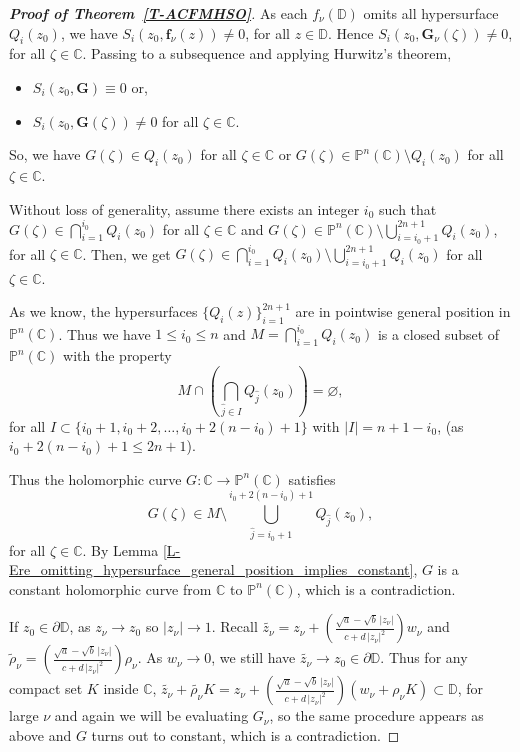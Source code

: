 \documentclass[11pt, reqno]{amsart}
\theoremstyle{definition}
\theoremstyle{remark}
\numberwithin{equation}{section}
\begin{document}
\begin{proof}[{\bf Proof of Theorem~\ref{T-ACFMHSO}}]
As each $f_{\nu}(\mathbb D)$ omits all hypersurface $Q_i(z_0)$, we have $S_i(z_0,\mathbf{f}_{\nu}(z))\neq 0$, for all 
$z\in\mathbb D$. Hence $S_i(z_0,\mathbf{G}_{\nu}(\zeta))\neq 0$, for all $\zeta\in\mathbb C$. Passing to a subsequence and applying Hurwitz's theorem,
\begin{itemize}
    \item $S_i(z_0,\mathbf{G})\equiv 0$ or,
    \item $S_i(z_0,\mathbf{G}(\zeta))\neq 0$ for all $\zeta\in\mathbb C$.
\end{itemize}
So, we have $G(\zeta)\in Q_i(z_0)$ for all $\zeta\in\mathbb C$ or $G(\zeta)\in\mathbb P^n(\mathbb C)\setminus Q_i(z_0)$
for all $\zeta\in\mathbb C$. %
\smallskip

Without loss of generality, assume there exists an integer $i_0$ such that $G(\zeta)\in\bigcap_{i=1}^{i_0} Q_i(z_0)$ for all 
$\zeta\in\mathbb C$ and $G(\zeta)\in\mathbb P^n(\mathbb C)\setminus \bigcup_{i=i_0+1}^{2n+1} Q_i(z_0)$, for all 
$\zeta\in\mathbb C$. Then, we get $G(\zeta)\in \bigcap_{i=1}^{i_0} Q_i(z_0)\setminus \bigcup_{i=i_0+1}^{2n+1} Q_i(z_0)$ 
for all $\zeta\in\mathbb C$. \smallskip

As we know, the hypersurfaces $\{Q_i(z)\}_{i=1}^{2n+1}$ are in pointwise general position in $\mathbb P^n(\mathbb C)$. Thus we
have $1\leq i_0\leq n$ and $M=\bigcap_{i=1}^{i_0} Q_i(z_0)$ is a closed subset of $\mathbb P^n(\mathbb C)$ with the property 
$$M\cap\left(\bigcap_{\hat{j}\in I} Q_{\hat{j}}(z_0)\right)=\varnothing,$$ for all $I\subset \{i_0+1,i_0+2,\dots, i_0+2(n-i_0)+1\}$ 
with $|I|=n+1-i_0$, (as $i_0+2(n-i_0)+1\leq 2n+1$).\smallskip

Thus the holomorphic curve $G:\mathbb C\to \mathbb P^n(\mathbb C)$ satisfies 
\begin{equation*}G(\zeta)\in M\setminus \bigcup_{\hat{j}=i_0+1}^{i_0+2(n-i_0)+1}Q_{\hat{j}}(z_0),\end{equation*}
for all $\zeta\in\mathbb C$. By Lemma \ref{L-Ere_omitting_hypersurface_general_position_implies_constant}, 
$G$ is a constant holomorphic curve from $\mathbb C$ to $\mathbb P^n(\mathbb C)$, which is a contradiction. \smallskip

If $z_0\in\partial\mathbb D$, as $z_{\nu}\to z_0$ so $|z_{\nu}|\to 1$. Recall 
$\widetilde{z_{\nu}}=z_{\nu}+\left(\frac{\sqrt{a}-\sqrt{b}\,|z_{\nu}|}{c+d\,|z_{\nu}|^2}\right)w_{\nu}$ and 
$\widetilde \rho_{\nu}=\left(\frac{\sqrt{a}-\sqrt{b}\,|z_{\nu}|}{c+d\,|z_{\nu}|^2}\right)\rho_{\nu}$. As $w_{\nu}\to 0$, we
still have $\widetilde{z_{\nu}}\to z_0\in\partial\mathbb D$. Thus for any compact set $K$ inside $\mathbb C$, 
$\widetilde{z_{\nu}}+\widetilde{\rho_{\nu}}K=z_{\nu}+\left(\frac{\sqrt{a}-\sqrt{b}\,|z_{\nu}|}{c+d\,|z_{\nu}|^2}\right)(w_{\nu}+\rho_{\nu} K)\subset\mathbb D$, 
for large $\nu$ and again we will be evaluating $G_{\nu}$, so the same procedure appears as above and $G$ turns out to 
constant, which is a contradiction. 
\end{proof}
\bigskip
\end{document}
